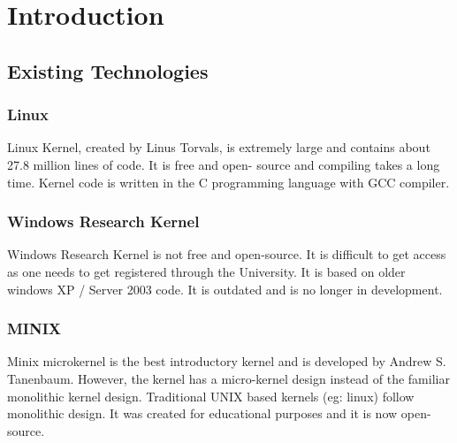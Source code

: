 
\chapter{Introduction}\label{chapter:Introduction}



\newpage
\section{Existing Technologies}\label{section:Existing Technologies}
\subsection{Linux}
Linux Kernel, created by Linus Torvals, is extremely large and contains about 27.8 million lines of code. It is free and open- source and compiling takes a long time. Kernel code is written in the C programming language with GCC compiler. 

\subsection{Windows Research Kernel}
Windows Research Kernel is not free and open-source. It is difficult to get access as one needs to get registered through the University. It is based on older windows XP / Server 2003 code. It is outdated and is no longer in development.  

\subsection{MINIX}
Minix microkernel is the best introductory kernel and is developed by Andrew S. Tanenbaum. However, the kernel has a micro-kernel design instead of the familiar monolithic kernel design. Traditional UNIX based kernels (eg: linux) follow monolithic design. It was created for educational purposes and it is now open-source.

